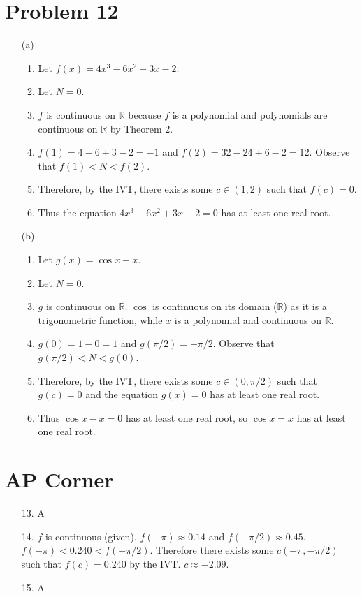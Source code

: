 \documentclass{article}
\newcommand*{\problem}[1]{\section*{Problem #1}}
\newcommand*{\aps}{\section*{AP Corner}}
\begin{document}
\problem{12}
\begin{itemize}
	\item[(a)]
	\begin{enumerate}
		\item Let $f(x)=4x^3-6x^2+3x-2$.
		\item Let $N=0$.
		\item $f$ is continuous on $\mathbb{R}$ because $f$ is a polynomial and polynomials are continuous on $\mathbb{R}$ by Theorem 2.
		\item $f(1)=4-6+3-2=-1$ and $f(2)=32-24+6-2=12$. Observe that $f(1)<N<f(2)$.
		\item Therefore, by the IVT, there exists some $c\in(1,2)$ such that $f(c)=0$.
		\item Thus the equation $4x^3-6x^2+3x-2=0$ has at least one real root.
	\end{enumerate}

	\item[(b)]
	\begin{enumerate}
		\item Let $g(x)=\cos x-x$.
		\item Let $N=0$.
		\item $g$ is continuous on $\mathbb{R}$. $\cos$ is continuous on its domain ($\mathbb{R}$) as it is a trigonometric function, while $x$ is a polynomial and continuous on $\mathbb{R}$.
		\item $g(0)=1-0=1$ and $g(\pi/2)=-\pi/2$. Observe that $g(\pi/2)<N<g(0)$.
		\item Therefore, by the IVT, there exists some $c\in(0,\pi/2)$ such that $g(c)=0$ and the equation $g(x)=0$ has at least one real root.
		\item Thus $\cos x-x=0$ has at least one real root, so $\cos x=x$ has at least one real root.
	\end{enumerate}
\end{itemize}

\aps
\begin{itemize}
	\item[13.]A
	\item[14.] $f$ is continuous (given). $f(-\pi)\approx0.14$ and $f(-\pi/2)\approx0.45$. $f(-\pi)<0.240<f(-\pi/2)$. Therefore there exists some $c(-\pi,-\pi/2)$ such that $f(c)=0.240$ by the IVT. $c\approx-2.09$.
	\item[15.]A
\end{itemize}
\end{document}
